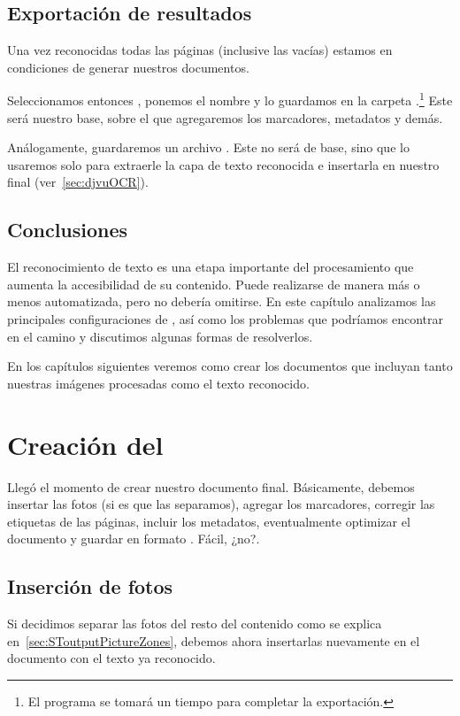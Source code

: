 \documentclass[%
	a5paper,
	10pt,
	twoside,
	openright,
	final,
]{memoir}
\begin{document}
{	\section{Exportación de resultados} Una vez reconocidas todas las páginas (inclusive las vacías) estamos en condiciones de generar nuestros documentos.

	Seleccionamos entonces , ponemos el nombre  y lo guardamos en la carpeta .\footnote{El programa se tomará un tiempo para completar la exportación.} Este será nuestro \pdf base, sobre el que agregaremos los marcadores, metadatos y demás.

	Análogamente, guardaremos un archivo . Este no será de base, sino que lo usaremos solo para extraerle la capa de texto reconocida e insertarla en nuestro \djvu final (ver~\ref{sec:djvuOCR}).

	\section{Conclusiones} El reconocimiento de texto es una etapa importante del procesamiento que aumenta la accesibilidad de su contenido. Puede realizarse de manera más o menos automatizada, pero no debería omitirse. En este capítulo analizamos las principales configuraciones de \abbyy, así como los problemas que podríamos encontrar en el camino y discutimos algunas formas de resolverlos.

	En los capítulos siguientes veremos como crear los documentos que incluyan tanto nuestras imágenes procesadas como el texto reconocido.

	\chapter{Creación del \texorpdfstring{\pdf}{PDF}} Llegó el momento de crear nuestro documento \pdf final. Básicamente, debemos insertar las fotos (si es que las separamos), agregar los marcadores, corregir las etiquetas de las páginas, incluir los metadatos, eventualmente optimizar el documento y guardar en formato \pdfa. Fácil, ¿no?.

	\section{Inserción de fotos\label{sec:pdfPhotos}} Si decidimos separar las fotos del resto del contenido como se explica en~\ref{sec:SToutputPictureZones}, debemos ahora insertarlas nuevamente en el documento con el texto ya reconocido.

}
\end{document}
